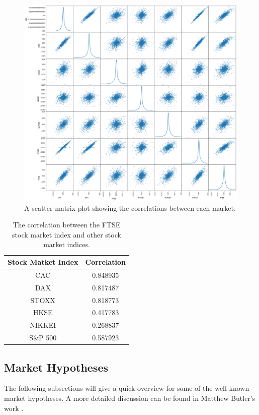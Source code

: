 \documentclass{UoYCSproject}
\begin{document}
\begin{figure}[h]
\includegraphics[width=12cm]{market_correlation}
\centering
\caption{A scatter matrix plot showing the correlations between each market.} 
\label{fig:scatterplot}
\end{figure}

\begin{table}[h]
    \centering
    \begin{tabular}{|c|c|} \hline
        \textbf{Stock Matket Index} & \textbf{Correlation} \\ \hline
        CAC &       0.848935 \\
        DAX  &     0.817487\\
        STOXX &    0.818773\\
        HKSE   &   0.417783\\
        NIKKEI  &  0.268837\\
        S\&P 500   & 0.587923\\

        \hline
    \end{tabular}
    \caption{The correlation between the FTSE stock market index and other stock market indices.}
    \label{tab:correlations}
\end{table}


\subsection{Market Hypotheses}
The following subsections will give a quick overview for some of the well known market hypotheses. A more detailed discussion can be found in Matthew Butler's work \cite{butler2012computational}.
\end{document}
